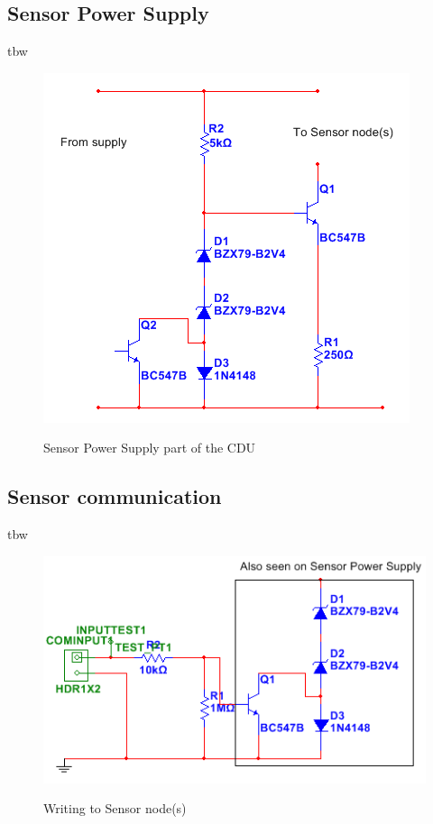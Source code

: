 \subsection{Sensor Power Supply}
tbw
\begin{figure}[H]
\centering
\includegraphics[scale=1]{billeder/cdusensorpowersupply}
\label{fig:cdusensorpowersupply}
\caption{Sensor Power Supply part of the CDU}
\end{figure}

\subsection{Sensor communication}
tbw

\begin{figure}[H]
\centering
\includegraphics[scale=1]{billeder/cdusensorsend}
\label{fig:cdusensorsend}
\caption{Writing to Sensor node(s)}
\end{figure}

